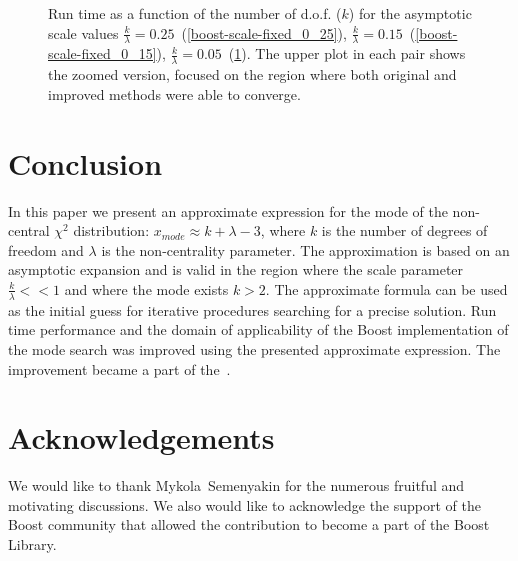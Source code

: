 \documentclass[final,5p,twocolumn,times,authoryear]{elsarticle}
\begin{document}
\begin{figure}[t]
\begin{subfigure}[t]{0.46\textwidth}
		\caption{}\label{boost-scale-fixed_0_05}
	\end{subfigure}
    \caption{Run time as a function of the number of d.o.f. ($k$) for the asymptotic scale values $\frac{k}{\lambda}=0.25$~(\ref{boost-scale-fixed_0_25}), $\frac{k}{\lambda}=0.15$~(\ref{boost-scale-fixed_0_15}), $\frac{k}{\lambda}=0.05$~(\ref{boost-scale-fixed_0_05}). The upper plot in each pair shows the zoomed version, focused on the region where both original and improved methods were able to converge.}\label{fig:boost-scale-fixed}
\end{figure}

\section{Conclusion}
In this paper we present an approximate expression for the mode of the non-central $\chi^2$ distribution: $x_{mode} \approx k + \lambda - 3$, where $k$ is the number of degrees of freedom and $\lambda$ is the non-centrality parameter. The approximation is based on an asymptotic expansion and is valid in the region where the scale parameter $\frac{k}{\lambda} << 1$ and where the mode exists $k > 2$. The approximate formula can be used as the initial guess for iterative procedures searching for a precise solution. Run time performance and the domain of applicability of the Boost implementation of the mode search was improved using the presented approximate expression. The improvement became a part of the~\cite{gbench-script}.

\section{Acknowledgements}

We would like to thank Mykola~Semenyakin for the numerous fruitful and motivating discussions. We also would like to acknowledge the support of the Boost community that allowed the contribution to become a part of the Boost Library.



\end{document}
